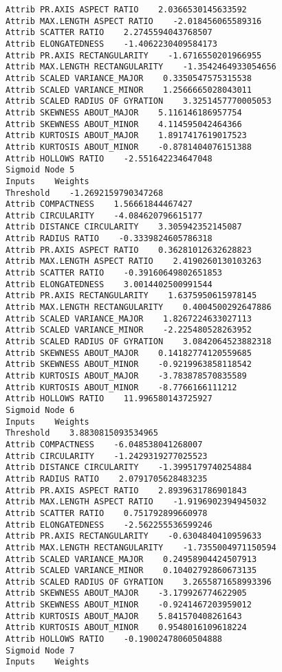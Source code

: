 \documentclass[
	article,			%
	11pt,				%
	oneside,			%
	a4paper,			%
	english,			%
	brazil,				%
	sumario=tradicional
	]{abntex2}
\begin{document}
\begin{lstlisting}
Attrib PR.AXIS ASPECT RATIO    2.0366530145633592
Attrib MAX.LENGTH ASPECT RATIO    -2.018456065589316
Attrib SCATTER RATIO    2.2745594043768507
Attrib ELONGATEDNESS    -1.4062230409584173
Attrib PR.AXIS RECTANGULARITY    -1.6716550201966955
Attrib MAX.LENGTH RECTANGULARITY    -1.3542464933054656
Attrib SCALED VARIANCE_MAJOR    0.3350547575315538
Attrib SCALED VARIANCE_MINOR    1.2566665028043011
Attrib SCALED RADIUS OF GYRATION    3.3251457770005053
Attrib SKEWNESS ABOUT_MAJOR    5.116146186957754
Attrib SKEWNESS ABOUT_MINOR    4.114595042464366
Attrib KURTOSIS ABOUT_MAJOR    1.8917417619017523
Attrib KURTOSIS ABOUT_MINOR    -0.8781404076151388
Attrib HOLLOWS RATIO    -2.551642234647048
Sigmoid Node 5
Inputs    Weights
Threshold    -1.2692159790347268
Attrib COMPACTNESS    1.56661844467427
Attrib CIRCULARITY    -4.084620796615177
Attrib DISTANCE CIRCULARITY    3.305942352145087
Attrib RADIUS RATIO    -0.3339824605786318
Attrib PR.AXIS ASPECT RATIO    0.36281012632628823
Attrib MAX.LENGTH ASPECT RATIO    2.4190260130103263
Attrib SCATTER RATIO    -0.39160649802651853
Attrib ELONGATEDNESS    3.0014402500991544
Attrib PR.AXIS RECTANGULARITY    1.6375950615978145
Attrib MAX.LENGTH RECTANGULARITY    0.4004500292647886
Attrib SCALED VARIANCE_MAJOR    1.8267224633027113
Attrib SCALED VARIANCE_MINOR    -2.225480528263952
Attrib SCALED RADIUS OF GYRATION    3.0842064523882318
Attrib SKEWNESS ABOUT_MAJOR    0.14182774120559685
Attrib SKEWNESS ABOUT_MINOR    -0.9219963858118542
Attrib KURTOSIS ABOUT_MAJOR    -3.783878570835589
Attrib KURTOSIS ABOUT_MINOR    -8.7766166111212
Attrib HOLLOWS RATIO    11.996580143725927
Sigmoid Node 6
Inputs    Weights
Threshold    3.8830815093534965
Attrib COMPACTNESS    -6.048538041268007
Attrib CIRCULARITY    -1.2429319277025523
Attrib DISTANCE CIRCULARITY    -1.3995179740254884
Attrib RADIUS RATIO    2.0791705628483235
Attrib PR.AXIS ASPECT RATIO    2.8939631786901843
Attrib MAX.LENGTH ASPECT RATIO    -1.9196902394945032
Attrib SCATTER RATIO    0.751792899660978
Attrib ELONGATEDNESS    -2.562255536599246
Attrib PR.AXIS RECTANGULARITY    -0.6304840410959633
Attrib MAX.LENGTH RECTANGULARITY    -1.7355004971150594
Attrib SCALED VARIANCE_MAJOR    0.24958904424507913
Attrib SCALED VARIANCE_MINOR    0.10402792860673135
Attrib SCALED RADIUS OF GYRATION    3.2655871658993396
Attrib SKEWNESS ABOUT_MAJOR    -3.179926774622905
Attrib SKEWNESS ABOUT_MINOR    -0.9241467203959012
Attrib KURTOSIS ABOUT_MAJOR    5.841570408261643
Attrib KURTOSIS ABOUT_MINOR    0.9548016109618224
Attrib HOLLOWS RATIO    -0.19002478060504888
Sigmoid Node 7
Inputs    Weights

\end{lstlisting}
\end{document}
